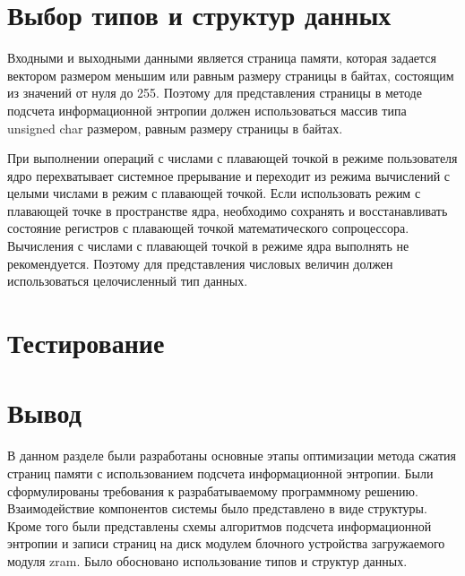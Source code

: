\section{Выбор типов и структур данных}

Входными и выходными данными является страница памяти, которая задается вектором размером меньшим или равным размеру страницы в байтах, состоящим из значений от нуля до 255. Поэтому для представления страницы в методе подсчета информационной энтропии должен использоваться массив типа unsigned char размером, равным размеру страницы в байтах.

При выполнении операций с числами с плавающей точкой в режиме пользователя ядро перехватывает системное прерывание и переходит из режима вычислений с целыми числами в режим с плавающей точкой. Если использовать режим с плавающей точке в пространстве ядра, необходимо сохранять и восстанавливать состояние регистров с плавающей точкой математического сопроцессора. Вычисления с числами с плавающей точкой в режиме ядра выполнять не рекомендуется. Поэтому для представления числовых величин должен использоваться целочисленный тип данных. 

\section{Тестирование}

\section*{Вывод}

В данном разделе были разработаны основные этапы оптимизации метода сжатия страниц памяти с использованием подсчета информационной энтропии. Были сформулированы требования к разрабатываемому программному решению. Взаимодействие компонентов системы было представлено в виде структуры. Кроме того были представлены схемы алгоритмов подсчета информационной энтропии и записи страниц на диск модулем блочного устройства загружаемого модуля zram. Было обосновано использование типов и структур данных.
